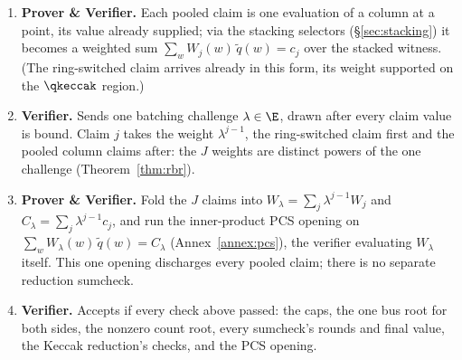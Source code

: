 \begin{enumerate}
\item \textbf{Prover \& Verifier.} Each pooled claim is one evaluation of a column at a point, its value already supplied; via the stacking selectors (\S\ref{sec:stacking}) it becomes a weighted sum $\sum_w W_j(w)\,\widetilde q(w)=c_j$ over the stacked witness. (The ring-switched claim arrives already in this form, its weight supported on the $\qkeccak$ region.)
\item \textbf{Verifier.} Sends one batching challenge $\lambda\in\E$, drawn after every claim value is bound. Claim $j$ takes the weight $\lambda^{j-1}$, the ring-switched claim first and the pooled column claims after: the $J$ weights are distinct powers of the one challenge (Theorem~\ref{thm:rbr}).
\item \textbf{Prover \& Verifier.} Fold the $J$ claims into $W_\lambda=\sum_j\lambda^{j-1} W_j$ and $C_\lambda=\sum_j\lambda^{j-1} c_j$, and run the inner-product PCS opening on $\sum_w W_\lambda(w)\,\widetilde q(w)=C_\lambda$ (Annex~\ref{annex:pcs}), the verifier evaluating $W_\lambda$ itself. This one opening discharges every pooled claim; there is no separate reduction sumcheck.
\item \textbf{Verifier.} Accepts if every check above passed: the caps, the one bus root for both sides, the nonzero count root, every sumcheck's rounds and final value, the Keccak reduction's checks, and the PCS opening.
\end{enumerate}

